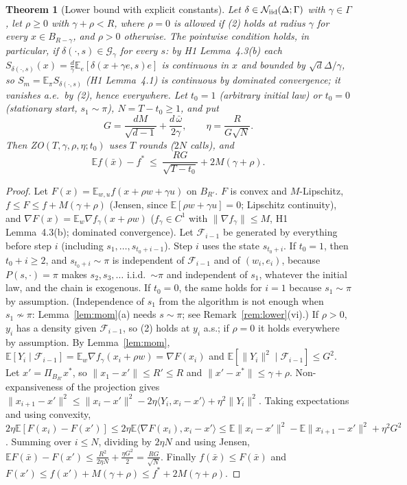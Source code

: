 \documentclass[11pt,a4paper]{article}
\numberwithin{equation}{section}
\newtheorem{theorem}{Theorem}[section]
\theoremstyle{definition}
\theoremstyle{remark}
\newcommand{\E}{\mathbb E}\newcommand{\R}{\mathbb R}\newcommand{\Z}{\mathbb Z}\newcommand{\Prob}{\mathbb P}
\newcommand{\norm}[1]{\lVert #1\rVert}\newcommand{\abs}[1]{\lvert #1\rvert}\newcommand{\ip}[2]{\langle #1,#2\rangle}
\newcommand{\cN}{\mathcal N}\newcommand{\cA}{\mathcal A}\newcommand{\cG}{\mathcal G}\newcommand{\cF}{\mathcal F}
\newcommand{\wbar}{\bar\omega}\newcommand{\Atwo}{\cA^{\rm 2pt}_\gamma}
\begin{document}
\begin{theorem}[Lower bound with explicit constants]\label{thm:lower}
Let $\delta\in\cN_\iid(\Delta;\Gamma)$ with $\gamma\in\Gamma$, let $\rho\ge0$ with $\gamma+\rho<R$, where $\rho=0$ is allowed if (2) holds at radius $\gamma$ for every $x\in B_{R-\gamma}$, and $\rho>0$ otherwise. The pointwise condition holds, in particular, if $\delta(\cdot,s)\in\cG_\gamma$ for every $s$: by H1 Lemma~4.3(b) each $S_{\delta(\cdot,s)}(x)=\frac d\gamma\E_e[\delta(x+\gamma e,s)e]$ is continuous in $x$ and bounded by $\sqrt d\Delta/\gamma$, so $S_m=\E_\pi S_{\delta(\cdot,s)}$ (H1 Lemma~4.1) is continuous by dominated convergence; it vanishes a.e.\ by (2), hence everywhere. Let $t_0=1$ (arbitrary initial law) or $t_0=0$ (stationary start, $s_1\sim\pi$), $N=T-t_0\ge1$, and put
\[
G=\frac{dM}{\sqrt{d-1}}+\frac{d\,\wbar}{2\gamma},\qquad \eta=\frac{R}{G\sqrt N}.
\]
Then ZO$(T,\gamma,\rho,\eta;t_0)$ uses $T$ rounds ($2N$ calls), and
\[
\E f(\bar x)-f^*\ \le\ \frac{RG}{\sqrt{T-t_0}}+2M(\gamma+\rho).
\]
\end{theorem}
\begin{proof}
Let $F(x)=\E_{w,u}f(x+\rho w+\gamma u)$ on $B_{R'}$. $F$ is convex and $M$-Lipschitz, $f\le F\le f+M(\gamma+\rho)$ (Jensen, since $\E[\rho w+\gamma u]=0$; Lipschitz continuity), and $\nabla F(x)=\E_w\nabla f_\gamma(x+\rho w)$ ($f_\gamma\in C^1$ with $\norm{\nabla f_\gamma}\le M$, H1 Lemma~4.3(b); dominated convergence). Let $\cF_{i-1}$ be generated by everything before step $i$ (including $s_1,\dots,s_{t_0+i-1}$). Step $i$ uses the state $s_{t_0+i}$. If $t_0=1$, then $t_0+i\ge2$, and $s_{t_0+i}\sim\pi$ is independent of $\cF_{i-1}$ and of $(w_i,e_i)$, because $P(s,\cdot)=\pi$ makes $s_2,s_3,\dots$ i.i.d.\ $\sim\pi$ and independent of $s_1$, whatever the initial law, and the chain is exogenous. If $t_0=0$, the same holds for $i=1$ because $s_1\sim\pi$ by assumption. (Independence of $s_1$ from the algorithm is not enough when $s_1\not\sim\pi$: Lemma~\ref{lem:mom}(a) needs $s\sim\pi$; see Remark~\ref{rem:lower}(vi).) If $\rho>0$, $y_i$ has a density given $\cF_{i-1}$, so (2) holds at $y_i$ a.s.; if $\rho=0$ it holds everywhere by assumption. By Lemma~\ref{lem:mom}, $\E[Y_i\mid\cF_{i-1}]=\E_w\nabla f_\gamma(x_i+\rho w)=\nabla F(x_i)$ and $\E[\norm{Y_i}^2\mid\cF_{i-1}]\le G^2$.
Let $x'=\Pi_{B_{R'}}x^*$, so $\norm{x_1-x'}\le R'\le R$ and $\norm{x'-x^*}\le\gamma+\rho$. Non-expansiveness of the projection gives $\norm{x_{i+1}-x'}^2\le\norm{x_i-x'}^2-2\eta\ip{Y_i}{x_i-x'}+\eta^2\norm{Y_i}^2$. Taking expectations and using convexity, $2\eta\E[F(x_i)-F(x')]\le2\eta\E\ip{\nabla F(x_i)}{x_i-x'}\le\E\norm{x_i-x'}^2-\E\norm{x_{i+1}-x'}^2+\eta^2G^2$. Summing over $i\le N$, dividing by $2\eta N$ and using Jensen,
$\E F(\bar x)-F(x')\le\frac{R^2}{2\eta N}+\frac{\eta G^2}2=\frac{RG}{\sqrt N}$.
Finally $f(\bar x)\le F(\bar x)$ and $F(x')\le f(x')+M(\gamma+\rho)\le f^*+2M(\gamma+\rho)$.
\end{proof}
\end{document}
